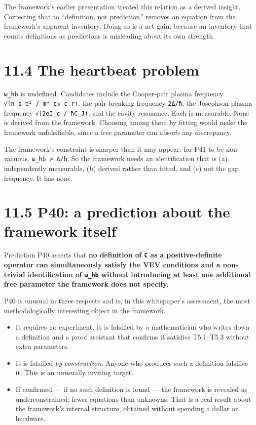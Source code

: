 \documentclass[
  11pt]{report}
\providecommand{\tightlist}{%
  \setlength{\itemsep}{0pt}\setlength{\parskip}{0pt}}
\begin{document}
The framework's earlier presentation treated this relation as a derived
insight. Correcting that to ``definition, not prediction'' removes an
equation from the framework's apparent inventory. Doing so is a net
gain, because an inventory that counts definitions as predictions is
misleading about its own strength.

\hypertarget{the-heartbeat-problem}{%
\section{11.4 The heartbeat problem}\label{the-heartbeat-problem}}

\texttt{ω\_hb} is undefined. Candidates include the Cooper-pair plasma
frequency \texttt{√(n\_s\ e²\ /\ m*\ ε₀\ ε\_r)}, the pair-breaking
frequency \texttt{2Δ/ħ}, the Josephson plasma frequency
\texttt{√(2eI\_c\ /\ ħC\_J)}, and the cavity resonance. Each is
measurable. None is derived from the framework. Choosing among them by
fitting would make the framework unfalsifiable, since a free parameter
can absorb any discrepancy.

The framework's constraint is sharper than it may appear: for P41 to be
non-vacuous, \texttt{ω\_hb\ ≠\ Δ/ħ}. So the framework needs an
identification that is (a) independently measurable, (b) derived rather
than fitted, and (c) not the gap frequency. It has none.

\hypertarget{p40-a-prediction-about-the-framework-itself}{%
\section{11.5 P40: a prediction about the framework
itself}\label{p40-a-prediction-about-the-framework-itself}}

Prediction P40 asserts that \textbf{no definition of \texttt{C} as a
positive-definite operator can simultaneously satisfy the VEV conditions
and a non-trivial identification of \texttt{ω\_hb} without introducing
at least one additional free parameter the framework does not specify.}

P40 is unusual in three respects and is, in this whitepaper's
assessment, the most methodologically interesting object in the
framework.

\begin{itemize}
\tightlist
\item
  It requires no experiment. It is falsified by a mathematician who
  writes down a definition and a proof assistant that confirms it
  satisfies T5.1--T5.3 without extra parameters.
\item
  It is falsified \emph{by construction}. Anyone who produces such a
  definition falsifies it. This is an unusually inviting target.
\item
  If confirmed --- if no such definition is found --- the framework is
  revealed as underconstrained: fewer equations than unknowns. That is a
  real result about the framework's internal structure, obtained without
  spending a dollar on hardware.
\end{itemize}
\end{document}
